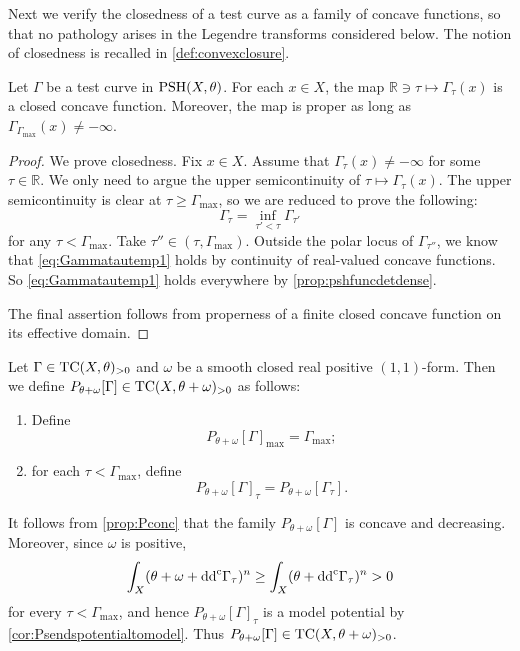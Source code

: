Next we verify the closedness of a test curve as a family of concave functions, so that no pathology arises in the Legendre transforms considered below. The notion of closedness is recalled in \cref{def:convexclosure}.
\begin{proposition}\label{prop:Gammaclosed}
    Let $\Gamma$ be a test curve in $\mathrm{PSH}(X,\theta)$. For each $x\in X$, the map $\mathbb{R} \ni\tau\mapsto \Gamma_{\tau}(x)$ is a closed concave function. Moreover, the map is proper as long as $\Gamma_{\Gamma_{\max}}(x)\neq -\infty$.
\end{proposition}

\begin{proof}
    We prove closedness.
    Fix $x\in X$. Assume that $\Gamma_{\tau}(x)\neq -\infty$ for some $\tau\in \mathbb{R}$. We only need to argue the upper semicontinuity of $\tau\mapsto \Gamma_{\tau}(x)$. The upper semicontinuity is clear at $\tau\geq \Gamma_{\max}$, so we are reduced to prove the following:
    \begin{equation}\label{eq:Gammatautemp1}
        \Gamma_{\tau}=\inf_{\tau'<\tau}\Gamma_{\tau'}
    \end{equation}
    for any $\tau<\Gamma_{\max}$. Take $\tau''\in (\tau,\Gamma_{\max})$. Outside the polar locus of $\Gamma_{\tau''}$, we know that \eqref{eq:Gammatautemp1} holds by continuity of real-valued concave functions. So \eqref{eq:Gammatautemp1} holds everywhere by \cref{prop:pshfuncdetdense}.

    The final assertion follows from properness of a finite closed concave function on its effective domain.
\end{proof}


\begin{definition}\label{def:Ptestcurve}
    Let $\Gamma\in \mathrm{TC}(X,\theta)_{>0}$ and $\omega$ be a smooth closed real positive $(1,1)$-form. Then we define
    $P_{\theta+\omega}[\Gamma]\in \mathrm{TC}(X,\theta+\omega)_{>0}$ as follows:
    \begin{enumerate}
        \item\label{itm:def:Ptestcurve:1} Define
        \[
        P_{\theta+\omega}[\Gamma]_{\max}=\Gamma_{\max};
        \]
        \item\label{itm:def:Ptestcurve:2} for each $\tau<\Gamma_{\max}$, define
        \[
        P_{\theta+\omega}[\Gamma]_{\tau}=P_{\theta+\omega}[\Gamma_{\tau}].
        \]
    \end{enumerate}
\end{definition}
It follows from \cref{prop:Pconc} that the family $P_{\theta+\omega}[\Gamma]$ is concave and decreasing. Moreover, since $\omega$ is positive,
\[
\int_X(\theta+\omega+\mathrm{dd}^{\mathrm{c}}\Gamma_\tau)^n \geq \int_X(\theta+\mathrm{dd}^{\mathrm{c}}\Gamma_\tau)^n>0
\]
for every $\tau<\Gamma_{\max}$, and hence $P_{\theta+\omega}[\Gamma]_\tau$ is a model potential by \cref{cor:Psendspotentialtomodel}. Thus $P_{\theta+\omega}[\Gamma]\in\mathrm{TC}(X,\theta+\omega)_{>0}$.

